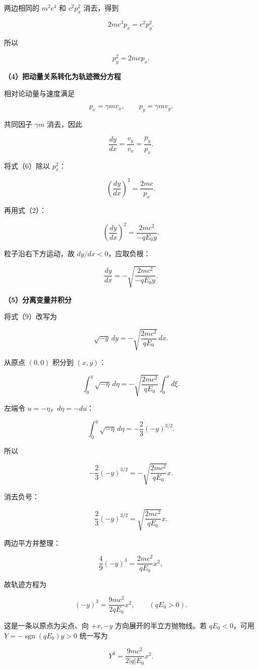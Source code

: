 \documentclass[12pt,a4paper,UTF8]{ctexart}
\begin{document}
两边相同的 \(m^2c^4\) 和 \(c^2p_x^2\) 消去，得到

\[
2mc^3p_x=c^2p_y^2.
\]

所以

\[
\boxed{p_y^2=2mcp_x}.
\tag{6}
\]

\textbf{（4）把动量关系转化为轨迹微分方程}

相对论动量与速度满足

\[
p_x=\gamma mv_x,
\qquad
p_y=\gamma mv_y.
\]

共同因子 \(\gamma m\) 消去，因此

\[
\frac{dy}{dx}
=\frac{v_y}{v_x}
=\frac{p_y}{p_x}.
\tag{7}
\]

将式（6）除以 \(p_x^2\)：

\[
\left(\frac{dy}{dx}\right)^2
=\frac{2mc}{p_x}.
\]

再用式（2）：

\[
\left(\frac{dy}{dx}\right)^2
=\frac{2mc^2}{-qE_0y}.
\tag{8}
\]

粒子沿右下方运动，故 \(dy/dx<0\)，应取负根：

\[
\frac{dy}{dx}
=-\sqrt{\frac{2mc^2}{-qE_0y}}.
\tag{9}
\]

\textbf{（5）分离变量并积分}

将式（9）改写为

\[
\sqrt{-y}\,dy
=-\sqrt{\frac{2mc^2}{qE_0}}\,dx.
\tag{10}
\]

从原点 \((0,0)\) 积分到 \((x,y)\)：

\[
\int_0^y\sqrt{-\eta}\,d\eta
=-\sqrt{\frac{2mc^2}{qE_0}}\int_0^x d\xi.
\]

左端令 \(u=-\eta\)，\(d\eta=-du\)：

\[
\int_0^y\sqrt{-\eta}\,d\eta
=-\frac23(-y)^{3/2}.
\]

所以

\[
-\frac23(-y)^{3/2}
=-\sqrt{\frac{2mc^2}{qE_0}}x.
\]

消去负号：

\[
\boxed{
\frac23(-y)^{3/2}
=\sqrt{\frac{2mc^2}{qE_0}}x
}.
\tag{11}
\]

两边平方并整理：

\[
\frac49(-y)^3
=\frac{2mc^2}{qE_0}x^2,
\]

故轨迹方程为

\[
\boxed{
(-y)^3=\frac{9mc^2}{2qE_0}x^2
},
\qquad(qE_0>0).
\tag{12}
\]

这是一条以原点为尖点、向 \(+x,-y\) 方向展开的半立方抛物线。若
\(qE_0<0\)，可用 \(Y=-\operatorname{sgn}(qE_0)y>0\) 统一写为

\[
Y^3=\frac{9mc^2}{2|q|E_0}x^2.
\]
\end{document}
